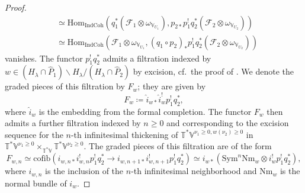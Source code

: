 \documentclass{amsart}
\theoremstyle{definition}
\theoremstyle{remark}
\numberwithin{equation}{section}
\newcommand{\mc}{\mathcal}
\newcommand{\Hom}{\mathrm{Hom}}
\newcommand{\wh}{\widehat}
\newcommand{\Sym}{\mathrm{Sym}}
\newcommand{\IndCoh}{\mathrm{IndCoh}}
\newcommand{\V}{\mathbb{V}}
\newcommand{\T}{\mathbb{T}}
\newcommand{\cofib}{\mathrm{cofib}}
\newcommand{\Nm}{\mathrm{Nm}}
\begin{document}
\begin{proof}
\begin{align*}
&\simeq
\Hom_{\IndCoh}(q_1^* (\mc F_1\otimes \omega_{\V_{U_1}}), p_{2*} p_1^! q_2^* (\mc F_2\otimes \omega_{\V_{U_2}})) \\
&\simeq
\Hom_{\IndCoh}(\mc F_1\otimes \omega_{\V_{U_1}},(q_1 \circ p_2)_* p_1^! q_2^* (\mc F_2\otimes \omega_{\V_{U_2}})) 
\end{align*}
vanishes. The functor $p_1^! q_2^*$ admits a filtration indexed by $w\in (H_{\lambda} \cap \wh P_1) \backslash H_{\lambda} / (H_{\lambda} \cap \wh P_2)$ by excision, cf.~the proof of \cite[Theorem 3.6.3]{HansenMann}. We denote the graded pieces of this filtration by $F_w$; they are given by
\begin{equation*}
    F_w \coloneq \wh{i}_{w \ast} \wh{i}^!_w p^!_1 q^{\ast}_2,
\end{equation*}
where $\wh{i}_w$ is the embedding from the formal completion. The functor $F_w$ then admits a further filtration indexed by $n\geq 0$ and corresponding to the excision sequence for the $n$-th infinitesimal thickening of $\T^* \V^{\nu_1 \geq 0, w(\nu_2)\geq 0}$ in $\T^\ast \V^{\nu_1\geq 0}\times_{\T^* \V}\T^\ast \V^{\nu_2\geq 0}$. The graded pieces of this filtration are of the form
\begin{equation*}
    F_{w,n} \simeq \cofib(i_{w, n \ast} i^!_{w,n} p^!_1 q^{\ast}_2 \rightarrow i_{w, n+1 \ast} i^!_{w, n+1} p^!_1 q^{\ast}_2) \simeq i_{w \ast}(\Sym^n \Nm_w \otimes  i^!_w p^!_1 q^{\ast}_2),
\end{equation*}
where $i_{w,n}$ is the inclusion of the $n$-th infinitesimal neighborhood and $\Nm_w$ is the normal bundle of $i_w$. 


\end{proof}
\end{document}
